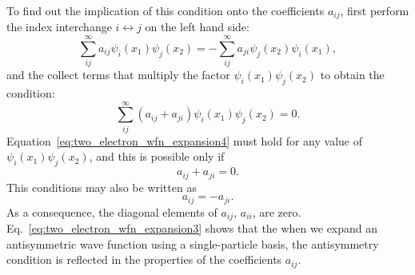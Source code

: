 \documentclass[../Main/chem532-notes.tex]{subfiles}
\begin{document}
\begin{example}
\begin{equation}
\end{equation}
To find out the implication of this condition onto the coefficients $a_{ij}$, first perform the index interchange $i \leftrightarrow j$ on the left hand side:
\begin{equation}
\sum_{ij}^{\infty} a_{ij} \psi_i(x_1) \psi_j(x_2) = -\sum_{ij}^{\infty} a_{ji} \psi_j(x_2) \psi_i(x_1),
\end{equation}
and the collect terms that multiply the factor $\psi_i(x_1) \psi_j(x_2)$ to obtain the condition:
\begin{equation}
\label{eq:two_electron_wfn_expansion4}
\sum_{ij}^{\infty} (a_{ij} + a_{ji}) \psi_i(x_1) \psi_j(x_2) = 0.
\end{equation}
Equation~\eqref{eq:two_electron_wfn_expansion4} must hold for any value of $\psi_i(x_1) \psi_j(x_2)$, and this is possible only if
\begin{equation} \label{eq:two_electron_wfn_expansion3}
a_{ij} + a_{ji} = 0.
\end{equation}
This conditions may also be written as 
\begin{equation}
a_{ij} = - a_{ji}.
\end{equation}
As a consequence, the diagonal elements of $a_{ij}$, $a_{ii}$, are zero.
Eq.~\eqref{eq:two_electron_wfn_expansion3} shows that the when we expand an antisymmetric wave function using a single-particle basis, the antisymmetry condition is reflected in the properties of the coefficients $a_{ij}$.



\end{example}
\end{document}
